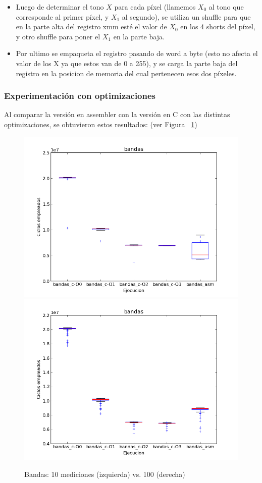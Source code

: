 \documentclass[a4paper]{article}
\begin{document}
\begin{itemize}
\item Luego de determinar el tono $X$ para cada píxel (llamemos $X_0$ al tono que corresponde al primer píxel, y $X_1$ al segundo), se utiliza un shuffle para que en la parte alta del registro xmm esté el valor de $X_0$ en los 4 shorts del píxel, y otro shuffle para poner el $X_1$ en la parte baja.
\item Por ultimo se empaqueta el registro pasando de word a byte (esto no afecta el valor de los X ya que estos van de 0 a 255), y se carga la parte baja del registro en la posicion de memoria del cual pertenecen esos dos píxeles.
\end{itemize}

\subsubsection{Experimentación con optimizaciones}

Al comparar la versión en assembler con la versión en C con las distintas optimizaciones, se obtuvieron estos resultados: (ver Figura ~\ref{fig:graficos_bandas})
\begin{figure}[htbp]
\centering
\includegraphics[scale=0.33]{imagenes/tiemposbandas.png}
\includegraphics[scale=0.33]{imagenes/tiemposbandas100.png}
\caption{Bandas: 10 mediciones (izquierda) vs. 100 (derecha)}
\label{fig:graficos_bandas}
\end{figure}
\end{document}
